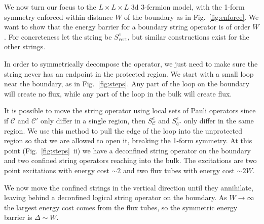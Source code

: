 \documentclass[twocolumn, longbibliography]{revtex4-2}
\newcommand{\C}{\mathcal{C}}
\renewcommand{\vert}{\text{vert}}
\begin{document}
We now turn our focus to the $L\times L\times L$ 3d 3-fermion model, with the 1-form symmetry enforced within distance $W$ of the boundary as in Fig.~\ref{fig:enforce}. We want to show that the energy barrier for a boundary string operator is of order $W$.
For concreteness let the string be $S^e_\vert$, but similar constructions exist for the other strings.

In order to symmetrically decompose the operator, we just need to make sure the string never has an endpoint in the protected region. We start with a small loop near the boundary, as in Fig.~\ref{fig:steps}. Any part of the loop on the boundary will create no flux, while any part of the loop in the bulk will create flux.

It is possible to move the string operator using local sets of Pauli operators since if $\C$ and $\C'$ only differ in a single region, then $S^e_\C$ and $S^e_{\C'}$ only differ in the same region. We use this method to pull the edge of the loop into the unprotected region so that we are allowed to open it, breaking the 1-form symmetry. At this point (Fig.~\ref{fig:steps}~ii) we have a deconfined string operator on the boundary and two confined string operators reaching into the bulk. The excitations are two point excitations with energy cost $\sim 2$ and two flux tubes with energy cost $\sim 2W$.

We now move the confined strings in the vertical direction until they annihilate, leaving behind a deconfined logical string operator on the boundary. As $W\to \infty$ the largest energy cost comes from the flux tubes, so the symmetric energy barrier is $\Delta\sim W$.
\end{document}
